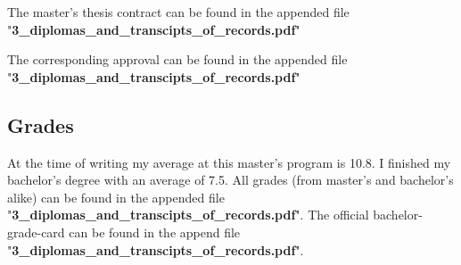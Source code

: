 \documentclass[a4paper]{article}
\begin{document}
The master's thesis contract can be found in the appended file "\textbf{3\_diplomas\_and\_transcipts\_of\_records.pdf}"\par

The corresponding approval can be found in the appended file "\textbf{3\_diplomas\_and\_transcipts\_of\_records.pdf}"

\subsection{Grades}

At the time of writing my average at this master's program is 10.8. I finished my bachelor's degree with an average of 7.5. All grades (from master's and bachelor's alike) can be found in the appended file "\textbf{3\_diplomas\_and\_transcipts\_of\_records.pdf}". The official bachelor-grade-card can be found in the append file "\textbf{3\_diplomas\_and\_transcipts\_of\_records.pdf}".\par
\end{document}
